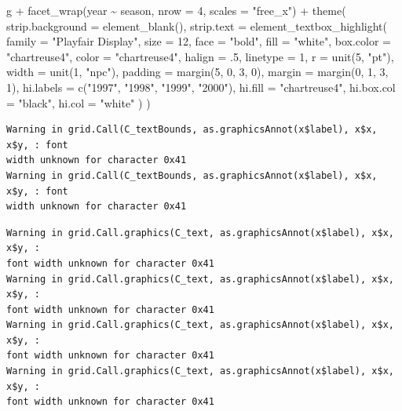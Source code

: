 \documentclass[
  letterpaper,
]{scrbook}
\newenvironment{Shaded}{\begin{snugshade}}{\end{snugshade}}
\newcommand{\AttributeTok}[1]{\textcolor[rgb]{0.40,0.45,0.13}{#1}}
\newcommand{\DecValTok}[1]{\textcolor[rgb]{0.68,0.00,0.00}{#1}}
\newcommand{\FunctionTok}[1]{\textcolor[rgb]{0.28,0.35,0.67}{#1}}
\newcommand{\NormalTok}[1]{\textcolor[rgb]{0.00,0.23,0.31}{#1}}
\newcommand{\SpecialCharTok}[1]{\textcolor[rgb]{0.37,0.37,0.37}{#1}}
\newcommand{\StringTok}[1]{\textcolor[rgb]{0.13,0.47,0.30}{#1}}
\begin{document}
\begin{Shaded}
\begin{Highlighting}[]
\NormalTok{g }\SpecialCharTok{+} \FunctionTok{facet\_wrap}\NormalTok{(year }\SpecialCharTok{\textasciitilde{}}\NormalTok{ season, }\AttributeTok{nrow =} \DecValTok{4}\NormalTok{, }\AttributeTok{scales =} \StringTok{"free\_x"}\NormalTok{) }\SpecialCharTok{+}
  \FunctionTok{theme}\NormalTok{(}
    \AttributeTok{strip.background =} \FunctionTok{element\_blank}\NormalTok{(),}
    \AttributeTok{strip.text =} \FunctionTok{element\_textbox\_highlight}\NormalTok{(}
      \AttributeTok{family =} \StringTok{"Playfair Display"}\NormalTok{, }\AttributeTok{size =} \DecValTok{12}\NormalTok{, }\AttributeTok{face =} \StringTok{"bold"}\NormalTok{,}
      \AttributeTok{fill =} \StringTok{"white"}\NormalTok{, }\AttributeTok{box.color =} \StringTok{"chartreuse4"}\NormalTok{, }\AttributeTok{color =} \StringTok{"chartreuse4"}\NormalTok{,}
      \AttributeTok{halign =}\NormalTok{ .}\DecValTok{5}\NormalTok{, }\AttributeTok{linetype =} \DecValTok{1}\NormalTok{, }\AttributeTok{r =} \FunctionTok{unit}\NormalTok{(}\DecValTok{5}\NormalTok{, }\StringTok{"pt"}\NormalTok{), }\AttributeTok{width =} \FunctionTok{unit}\NormalTok{(}\DecValTok{1}\NormalTok{, }\StringTok{"npc"}\NormalTok{),}
      \AttributeTok{padding =} \FunctionTok{margin}\NormalTok{(}\DecValTok{5}\NormalTok{, }\DecValTok{0}\NormalTok{, }\DecValTok{3}\NormalTok{, }\DecValTok{0}\NormalTok{), }\AttributeTok{margin =} \FunctionTok{margin}\NormalTok{(}\DecValTok{0}\NormalTok{, }\DecValTok{1}\NormalTok{, }\DecValTok{3}\NormalTok{, }\DecValTok{1}\NormalTok{),}
      \AttributeTok{hi.labels =} \FunctionTok{c}\NormalTok{(}\StringTok{"1997"}\NormalTok{, }\StringTok{"1998"}\NormalTok{, }\StringTok{"1999"}\NormalTok{, }\StringTok{"2000"}\NormalTok{),}
      \AttributeTok{hi.fill =} \StringTok{"chartreuse4"}\NormalTok{, }\AttributeTok{hi.box.col =} \StringTok{"black"}\NormalTok{, }\AttributeTok{hi.col =} \StringTok{"white"}
\NormalTok{    )}
\NormalTok{  )}
\end{Highlighting}
\end{Shaded}

\begin{verbatim}
Warning in grid.Call(C_textBounds, as.graphicsAnnot(x$label), x$x, x$y, : font
width unknown for character 0x41
Warning in grid.Call(C_textBounds, as.graphicsAnnot(x$label), x$x, x$y, : font
width unknown for character 0x41
\end{verbatim}

\begin{verbatim}
Warning in grid.Call.graphics(C_text, as.graphicsAnnot(x$label), x$x, x$y, :
font width unknown for character 0x41
Warning in grid.Call.graphics(C_text, as.graphicsAnnot(x$label), x$x, x$y, :
font width unknown for character 0x41
Warning in grid.Call.graphics(C_text, as.graphicsAnnot(x$label), x$x, x$y, :
font width unknown for character 0x41
Warning in grid.Call.graphics(C_text, as.graphicsAnnot(x$label), x$x, x$y, :
font width unknown for character 0x41
\end{verbatim}
\end{document}

